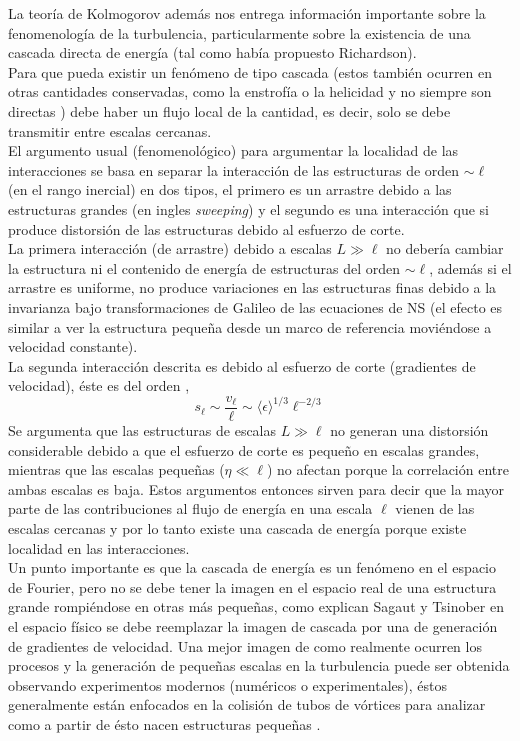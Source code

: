 \documentclass[executivepaper,12pt]{article}
\numberwithin{equation}{section}
\begin{document}
La teoría de Kolmogorov además nos entrega información importante sobre la fenomenología de la turbulencia, particularmente sobre la existencia de una cascada directa de energía (tal como había propuesto Richardson).\\
 Para que pueda existir un fenómeno de tipo cascada (estos también ocurren en otras cantidades conservadas, como la enstrofía o la helicidad y no siempre son directas \parencite{alexakis2018}) debe haber un flujo local de la cantidad, es decir, solo se debe transmitir entre escalas cercanas. \\
 El argumento usual (fenomenológico) para argumentar la localidad de las interacciones se basa en separar la interacción de las estructuras de orden $\sim \ell$ (en el rango inercial) en dos tipos, el primero es un arrastre debido a las estructuras grandes (en ingles \textit{sweeping}) y el segundo es una interacción que si produce distorsión de las estructuras debido al esfuerzo de corte.     \\
 La primera interacción (de arrastre) debido a escalas $L\gg\ell$ no debería cambiar la estructura ni el contenido de energía de estructuras del orden $\sim \ell$, además si el arrastre es uniforme, no produce variaciones en las estructuras finas debido a la invarianza bajo transformaciones de Galileo de las ecuaciones de NS (el efecto es similar a ver la estructura pequeña desde un marco de referencia moviéndose a velocidad constante). \\
 La segunda interacción descrita es debido al esfuerzo de corte (gradientes de velocidad), éste es del orden \parencite{frisch1995},
 \begin{equation*}
 	s_{\ell}\sim \frac{v_{\ell}}{\ell}\sim \langle\epsilon\rangle^{1/3}\ell^{-2/3}
 \end{equation*}
Se argumenta que las estructuras de escalas $L\gg \ell$ no generan una distorsión considerable debido a que el esfuerzo de corte es pequeño en escalas grandes, mientras que las escalas pequeñas ($\eta\ll \ell$) no afectan porque la correlación entre ambas escalas es baja. Estos argumentos entonces sirven para decir que la mayor parte de las contribuciones al flujo de energía en una escala $\ell$ vienen de las escalas cercanas y por lo tanto existe una cascada de energía porque existe localidad en las interacciones.\\

Un punto importante es que la cascada de energía es un fenómeno en el espacio de Fourier, pero no se debe tener la imagen en el espacio real de una estructura grande rompiéndose en otras más pequeñas, como explican Sagaut y Tsinober \parencite{sagaut2008,tsinober2009} en el espacio físico se debe reemplazar la imagen de cascada por una de generación de gradientes de velocidad. Una mejor imagen de como realmente ocurren los procesos y la generación de pequeñas escalas en la turbulencia puede ser obtenida observando experimentos modernos (numéricos o experimentales), éstos generalmente están enfocados en la colisión de tubos de vórtices para analizar como a partir de ésto nacen estructuras pequeñas \parencite{rubinstein2018,yao2020}. 
  
\end{document}
